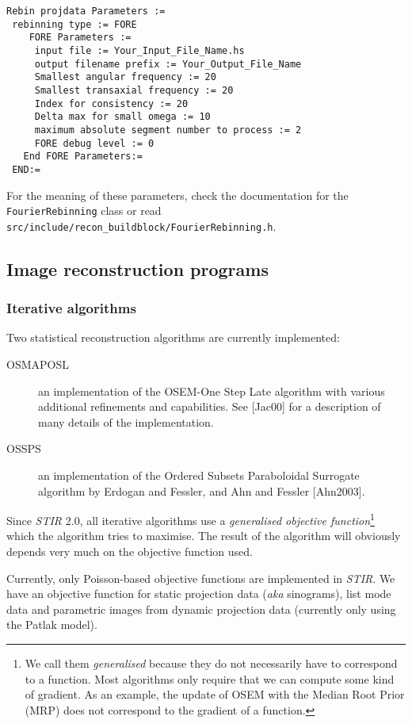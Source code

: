 \documentclass{article}
\begin{document}
{\small 
\begin{verbatim}
Rebin projdata Parameters :=
 rebinning type := FORE
    FORE Parameters :=
     input file := Your_Input_File_Name.hs
     output filename prefix := Your_Output_File_Name
     Smallest angular frequency := 20
     Smallest transaxial frequency := 20
     Index for consistency := 20
     Delta max for small omega := 10
     maximum absolute segment number to process := 2
     FORE debug level := 0
   End FORE Parameters:=
 END:=
\end{verbatim}
}
For the meaning of these parameters, check the documentation for the
\texttt{FourierRebinning} class or read
\texttt{src/include/recon\_buildblock/FourierRebinning.h}.

\subsection{
Image reconstruction programs}




\subsubsection{
Iterative algorithms}

Two statistical reconstruction algorithms are currently implemented:
\begin{description}
\item[OSMAPOSL] an implementation 
of the OSEM-One Step Late algorithm with various additional refinements 
and capabilities. See [Jac00] for a description of many details of the
implementation.
\item[OSSPS] an implementation of the Ordered Subsets Paraboloidal
Surrogate algorithm by Erdogan and Fessler, and Ahn and Fessler [Ahn2003]. 
\end{description}

Since \textit{STIR} 2.0, all iterative algorithms use a \textit{generalised objective 
function}\footnote{We call them \textit{generalised} because they do not
necessarily have to correspond to a function. Most algorithms only require
that we can compute some kind of gradient. As an example, the update
of OSEM with the Median Root Prior (MRP) does not correspond to the
gradient of a function.} which the algorithm tries to maximise. The result
of the algorithm will obviously depends very much on the objective function
used.

Currently, only Poisson-based objective functions are implemented in \textit{STIR}. We
have an objective function for static projection data (\textit{aka} sinograms),
list mode data and parametric images from dynamic projection data 
(currently only using the Patlak model).
\end{document}
